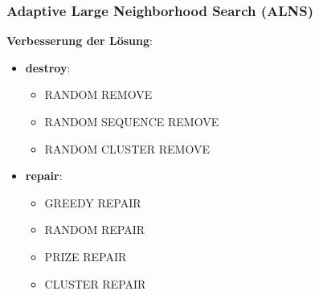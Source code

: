 \documentclass{beamer}
\begin{document}
\begin{frame}
  \frametitle{Adaptive Large Neighborhood Search (ALNS)}
  \textbf{Verbesserung der Lösung}:
  \begin{itemize}
    \item \textbf{destroy}:
    \begin{itemize}
      \item \textsc{RANDOM REMOVE}
      \item \textsc{RANDOM SEQUENCE REMOVE}
      \item \textsc{RANDOM CLUSTER REMOVE}
    \end{itemize}
    \item \textbf{repair}: 
    \begin{itemize}
      \item \textsc{GREEDY REPAIR}
      \item \textsc{RANDOM REPAIR}
      \item \textsc{PRIZE REPAIR}
      \item \textsc{CLUSTER REPAIR}
    \end{itemize}
  \end{itemize}
\end{frame}
\end{document}

